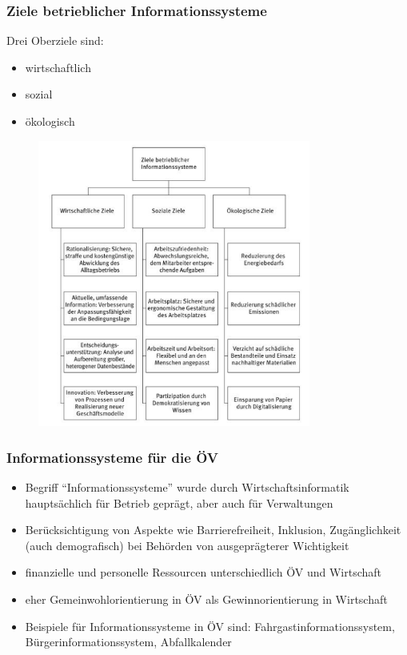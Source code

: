 \clearpage
\subsubsection{Ziele betrieblicher Informationssysteme}
Drei Oberziele sind:
\begin{itemize}
  \item wirtschaftlich
  \item sozial
  \item ökologisch
\end{itemize}
\begin{figure}[htp]
\begin{center}
\includegraphics[width=0.8\textwidth]{assets/ZielebetrieblicherInfosysteme.PNG}
\end{center}
\end{figure}

\clearpage
\subsubsection{Informationssysteme für die ÖV}
\begin{itemize}
  \item Begriff “Informationssysteme” wurde durch Wirtschaftsinformatik hauptsächlich für Betrieb geprägt, aber auch für Verwaltungen
  \item Berücksichtigung von Aspekte wie Barrierefreiheit, Inklusion, Zugänglichkeit (auch demografisch) bei Behörden von ausgeprägterer Wichtigkeit
  \item finanzielle und personelle Ressourcen unterschiedlich ÖV und Wirtschaft
  \item eher Gemeinwohlorientierung in ÖV als Gewinnorientierung in Wirtschaft
  \item Beispiele für Informationssysteme in ÖV sind: Fahrgastinformationssystem, Bürgerinformationssystem, Abfallkalender
\end{itemize}

